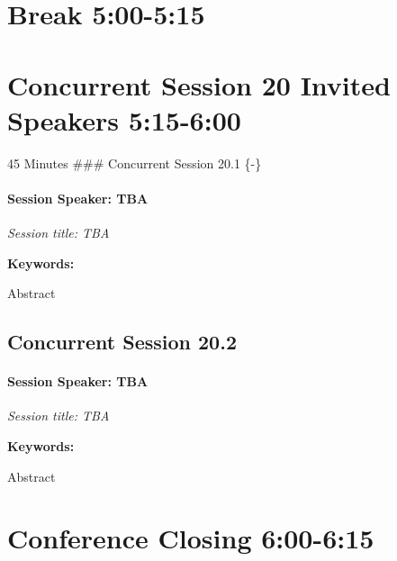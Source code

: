 \documentclass[
]{book}
\begin{document}
\hypertarget{break-500-515}{%
\section*{Break \textbar{} 5:00-5:15}\label{break-500-515}}

\hypertarget{concurrent-session-20-invited-speakers-515-600}{%
\section*{Concurrent Session 20 \textbar{} Invited Speakers \textbar{} 5:15-6:00}\label{concurrent-session-20-invited-speakers-515-600}}

45 Minutes
\#\#\# Concurrent Session 20.1 \{-\}

\begin{speaker}
\hypertarget{session-speaker-tba}{%
\paragraph{\texorpdfstring{Session Speaker:
\textbf{TBA}}{Session Speaker: TBA}}\label{session-speaker-tba}}

\emph{Session title: TBA}

\textbf{Keywords:}

Abstract
\end{speaker}

\hypertarget{concurrent-session-20.2}{%
\subsection*{Concurrent Session 20.2}\label{concurrent-session-20.2}}

\begin{speaker}
\hypertarget{session-speaker-tba}{%
\paragraph{\texorpdfstring{Session Speaker:
\textbf{TBA}}{Session Speaker: TBA}}\label{session-speaker-tba}}

\emph{Session title: TBA}

\textbf{Keywords:}

Abstract
\end{speaker}

\hypertarget{conference-closing-600-615}{%
\section*{Conference Closing \textbar{} 6:00-6:15}\label{conference-closing-600-615}}
\end{document}
